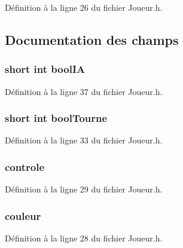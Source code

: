 Définition à la ligne 26 du fichier Joueur.\-h.



\subsection{Documentation des champs}
\hypertarget{struct_joueur_ad27c2d8e0b25d849fbb931f8d01b317d}{
\subsubsection[{bool\-I\-A}]{\setlength{\rightskip}{0pt plus 5cm}short int bool\-I\-A}}\label{struct_joueur_ad27c2d8e0b25d849fbb931f8d01b317d}


Définition à la ligne 37 du fichier Joueur.\-h.

\hypertarget{struct_joueur_a92bcbcbba7d261bcc12d14ee759c4ca1}{
\subsubsection[{bool\-Tourne}]{\setlength{\rightskip}{0pt plus 5cm}short int bool\-Tourne}}\label{struct_joueur_a92bcbcbba7d261bcc12d14ee759c4ca1}


Définition à la ligne 33 du fichier Joueur.\-h.

\hypertarget{struct_joueur_a4b5b0893ad6bb731d2697ac3734d804e}{
\subsubsection[{controle}]{ controle}}\label{struct_joueur_a4b5b0893ad6bb731d2697ac3734d804e}


Définition à la ligne 29 du fichier Joueur.\-h.

\hypertarget{struct_joueur_af0e152d09c13944935e00bef7a3c5111}{
\subsubsection[{couleur}]{ couleur}}\label{struct_joueur_af0e152d09c13944935e00bef7a3c5111}


Définition à la ligne 28 du fichier Joueur.\-h.

